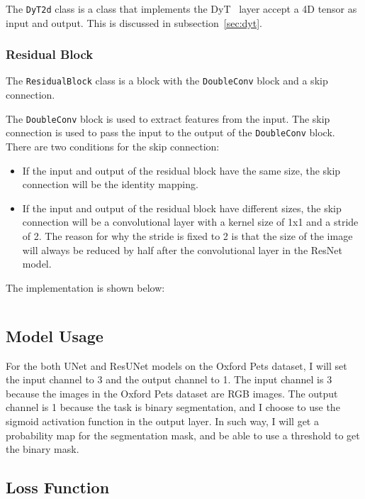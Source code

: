 \inputminted[firstline=23, highlightlines={35,36,40,41}]{python}{../src/models/common.py}

The \texttt{DyT2d} class is a class that implements the DyT~\cite{DyT} layer accept a 4D tensor as input and output.
This is discussed in subsection~\ref{sec:dyt}.

\subsubsection{Residual Block}
\label{sec:residual_block}

The \texttt{ResidualBlock} class is a block with the \texttt{DoubleConv} block and a skip connection.

The \texttt{DoubleConv} block is used to extract features from the input.
The skip connection is used to pass the input to the output of the \texttt{DoubleConv} block.
There are two conditions for the skip connection:
\begin{itemize}
    \item If the input and output of the residual block have the same size, the skip connection will be the identity mapping.
    \item If the input and output of the residual block have different sizes, the skip connection will be a convolutional layer with a kernel size of 1x1 and a stride of 2.
          The reason for why the stride is fixed to 2 is that the size of the image will always be reduced by half after the convolutional layer in the ResNet model.
\end{itemize}

The implementation is shown below:

\inputminted[firstline=7, lastline=20]{python}{../src/models/resnet34_unet.py}

\subsection{Model Usage}

For the both UNet and ResUNet models on the Oxford Pets dataset, I will set the input channel to 3 and the output channel to 1.
The input channel is 3 because the images in the Oxford Pets dataset are RGB images.
The output channel is 1 because the task is binary segmentation, and I choose to use the sigmoid activation function in the output layer.
In such way, I will get a probability map for the segmentation mask, and be able to use a threshold to get the binary mask.

\subsection{Loss Function}
\label{sec:loss_function}

